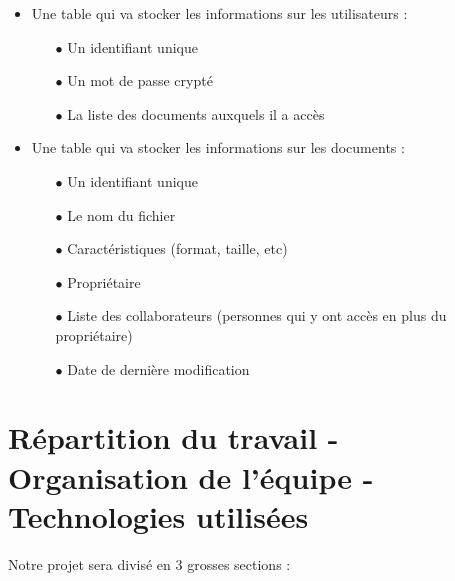 	\begin{itemize}
		
		\item Une table qui va stocker les informations sur les utilisateurs : \par
		
		\begin{itemize}
			
			\item[$\bullet$] Un identifiant unique
			
			\item[$\bullet$] Un mot de passe crypté
			
			\item[$\bullet$] La liste des documents auxquels il a accès
			
		\end{itemize}
		
		\item Une table qui va stocker les informations sur les documents : \par
		
		\begin{itemize}
		
			\item[$\bullet$] Un identifiant unique
			
			\item[$\bullet$] Le nom du fichier
			
			\item[$\bullet$] Caractéristiques (format, taille, etc)
			
			\item[$\bullet$] Propriétaire
			
			\item[$\bullet$] Liste des collaborateurs (personnes qui y ont accès en plus du propriétaire)
			
			\item[$\bullet$] Date de dernière modification
		
		\end{itemize}
	
	\end{itemize}
	
	\newpage
	
	\section{Répartition du travail - Organisation de l'équipe - Technologies utilisées}
	
	Notre projet sera divisé en 3 grosses sections : \par
	
